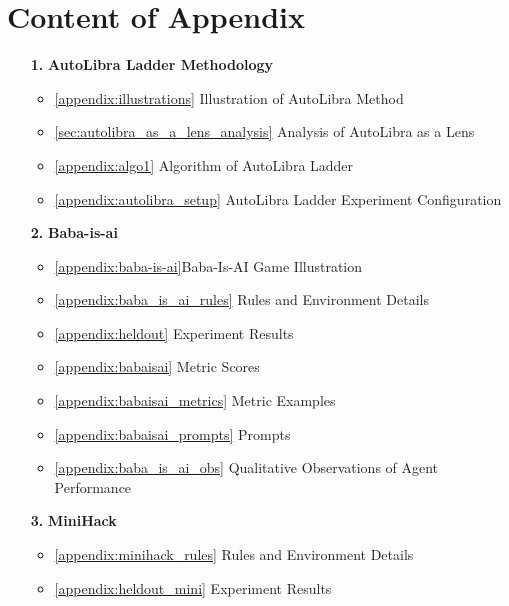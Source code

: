 \section*{Content of Appendix}
\begin{itemize}
	\item[\textbf{1.}] \textbf{AutoLibra Ladder Methodology}
		\begin{itemize}
            \item \ref{appendix:illustrations} Illustration of AutoLibra Method
            \item  \ref{sec:autolibra_as_a_lens_analysis} Analysis of AutoLibra as a Lens
			\item \ref{appendix:algo1} Algorithm of AutoLibra Ladder

			\item \ref{appendix:autolibra_setup} AutoLibra Ladder Experiment Configuration
		\end{itemize}

	\item[\textbf{2.}] \textbf{Baba-is-ai}
		\begin{itemize}
            \item \ref{appendix:baba-is-ai}Baba-Is-AI Game Illustration

			\item \ref{appendix:baba_is_ai_rules} Rules and Environment Details

			\item \ref{appendix:heldout} Experiment Results

			\item \ref{appendix:babaisai} Metric Scores

			\item \ref{appendix:babaisai_metrics} Metric Examples

			\item \ref{appendix:babaisai_prompts} Prompts

			\item \ref{appendix:baba_is_ai_obs} Qualitative Observations of Agent Performance
		\end{itemize}

	\item[\textbf{3.}] \textbf{MiniHack}
		\begin{itemize}
			\item \ref{appendix:minihack_rules} Rules and Environment Details

			\item \ref{appendix:heldout_mini} Experiment Results


\end{itemize}
\end{itemize}
